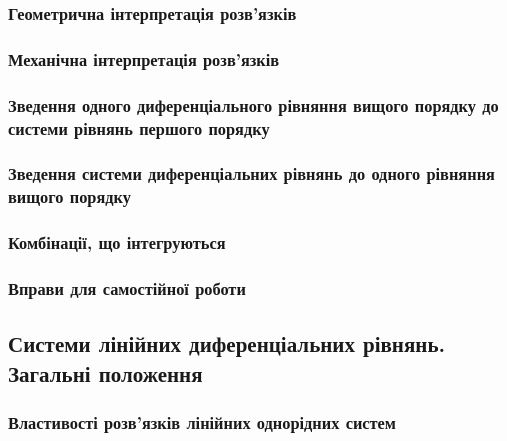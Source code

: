 \documentclass[a4paper, 12pt]{article}
\theoremstyle{definition}
\numberwithin{equation}{section}%
\numberwithin{equation}{subsection}
\begin{document}


\subsubsection{Геометрична інтерпретація розв'язків}



\subsubsection{Механічна інтерпретація розв'язків}



\subsubsection{Зведення одного диференціального рівняння вищого порядку до системи рівнянь першого порядку}



\subsubsection{Зведення системи диференціальних рівнянь до одного рівняння вищого порядку}



\subsubsection{Комбінації, що інтегруються}



\subsubsection{Вправи для самостійної роботи}



\subsection{Системи лінійних диференціальних рівнянь. Загальні положення \todo}



\subsubsection{Властивості розв'язків лінійних однорідних систем \todo}
\end{document}
